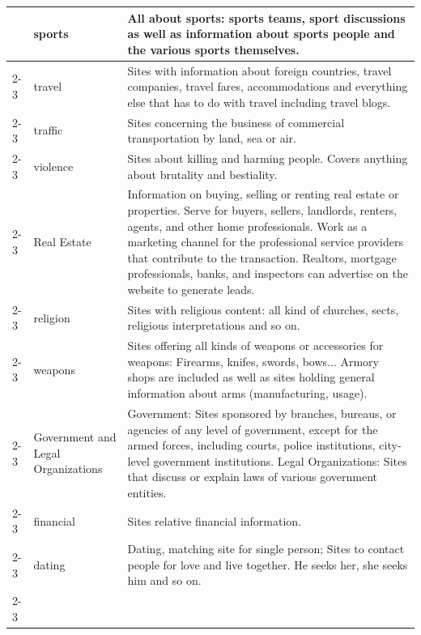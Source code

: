 \begin{longtable}{p{}|p{}|p{}}
                                                         & sports & All about sports: sports teams, sport discussions as well as information about sports people and the various sports themselves.\\ \cline{2-3}
                                                         & travel & Sites with information about foreign countries, travel companies, travel fares, accommodations and everything else that has to do with travel including travel blogs.\\ \cline{2-3}
                                                         & traffic & Sites concerning the business of commercial transportation by land, sea or air. \\ \cline{2-3}
                                                         & violence & Sites about killing and harming people. Covers anything about brutality and bestiality. \\ \cline{2-3}
                                                         & Real Estate & Information on buying, selling or renting real estate or properties. Serve for buyers, sellers, landlords, renters, agents, and other home professionals. Work as a marketing channel for the professional service providers that contribute to the transaction. Realtors, mortgage professionals, banks, and inspectors can advertise on the website to generate leads.\\ \cline{2-3}
                                                         & religion & Sites with religious content: all kind of churches, sects, religious interpretations and so on. \\ \cline{2-3}
                                                         & weapons & Sites offering all kinds of weapons or accessories for weapons: Firearms, knifes, swords, bows... Armory shops are included as well as sites holding general information about arms (manufacturing, usage).\\ \cline{2-3}
                                                         & Government and Legal Organizations & Government: Sites sponsored by branches, bureaus, or agencies of any level of government, except for the armed forces, including courts, police institutions, city-level government institutions. Legal Organizations: Sites that discuss or explain laws of various government entities.\\ \cline{2-3}
                                                         & financial & Sites relative financial information. \\ \cline{2-3}
                                                         & dating & Dating, matching site for single person; Sites to contact people for love and live together. He seeks her, she seeks him and so on.\\ \cline{2-3}

\end{longtable}
